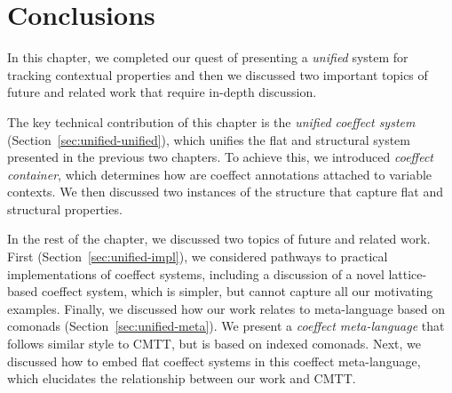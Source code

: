 %                                                                             
%                                                                             

\section{Conclusions}

In this chapter, we completed our quest of presenting a \emph{unified} system for tracking contextual
properties and then we discussed two important topics of future and related work that require 
in-depth discussion.

The key technical contribution of this chapter is the \emph{unified coeffect system} 
(Section~\ref{sec:unified-unified}), which unifies the flat and structural system presented
in the previous two chapters. To achieve this, we introduced \emph{coeffect container}, which
determines how are coeffect annotations attached to variable contexts. We then discussed two
instances of the structure that capture flat and structural properties.

In the rest of the chapter, we discussed two topics of future and related work. First
(Section~\ref{sec:unified-impl}), we considered pathways to practical implementations of
coeffect systems, including a discussion of a novel lattice-based coeffect system, which is simpler,
but cannot capture all our motivating examples. Finally, we discussed how our work relates to 
meta-language based on comonads (Section~\ref{sec:unified-meta}). We present a \emph{coeffect 
meta-language} that follows similar style to CMTT, but is based on indexed comonads. Next, we 
discussed how to embed flat coeffect systems in this coeffect meta-language, which elucidates the 
relationship between our work and CMTT. 